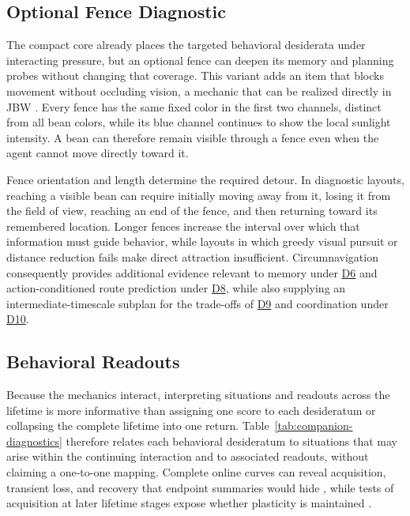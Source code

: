 \documentclass[10pt,journal,compsoc]{IEEEtran}
\DeclareRobustCommand{\Dref}[1]{\hyperref[sec:d#1]{D#1}}
\begin{document}
\subsection{Optional Fence Diagnostic}
\label{sec:fence-diagnostic}

The compact core already places the targeted behavioral desiderata under interacting pressure, but an optional fence can deepen its memory and planning probes without changing that coverage.
This variant adds an item that blocks movement without occluding vision, a mechanic that can be realized directly in JBW \cite{platanios2020}.
Every fence has the same fixed color in the first two channels, distinct from all bean colors, while its blue channel continues to show the local sunlight intensity.
A bean can therefore remain visible through a fence even when the agent cannot move directly toward it.

Fence orientation and length determine the required detour.
In diagnostic layouts, reaching a visible bean can require initially moving away from it, losing it from the field of view, reaching an end of the fence, and then returning toward its remembered location.
Longer fences increase the interval over which that information must guide behavior, while layouts in which greedy visual pursuit or distance reduction fails make direct attraction insufficient.
Circumnavigation consequently provides additional evidence relevant to memory under \Dref{6} and action-conditioned route prediction under \Dref{8}, while also supplying an intermediate-timescale subplan for the trade-offs of \Dref{9} and coordination under \Dref{10}.

\subsection{Behavioral Readouts}

Because the mechanics interact, interpreting situations and readouts across the lifetime is more informative than assigning one score to each desideratum or collapsing the complete lifetime into one return.
Table~\ref{tab:companion-diagnostics} therefore relates each behavioral desideratum to situations that may arise within the continuing interaction and to associated readouts, without claiming a one-to-one mapping.
Complete online curves can reveal acquisition, transient loss, and recovery that endpoint summaries would hide \cite{delange2023}, while tests of acquisition at later lifetime stages expose whether plasticity is maintained \cite{dohare2024}.
\end{document}
